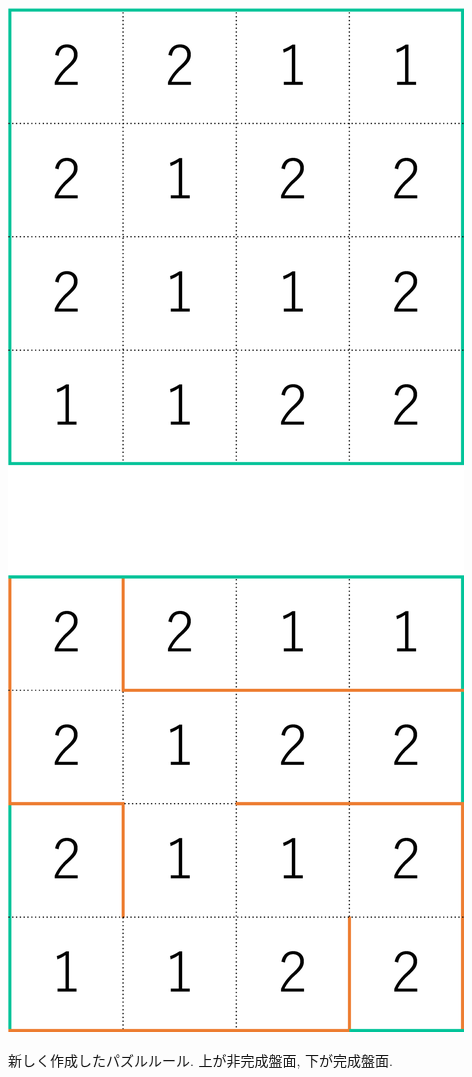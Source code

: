 \begin{clearpagefigure}
  \includegraphics[width=0.5\linewidth,clip]{fig/NewPuzzle.eps}
  \caption{新しく作成したパズルルール. 上が非完成盤面, 下が完成盤面. }
  \label{figure:NewPuzzleRule}
\end{clearpagefigure}
